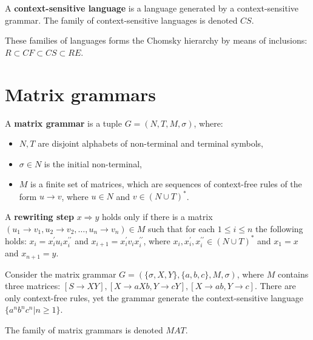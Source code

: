 \begin{definition}
A {\bf context-sensitive language} is a language generated by a context-sensitive grammar. The family of context-sensitive languages is denoted $CS$.
\end{definition}

These families of languages forms the Chomsky hierarchy by means of inclusions: $R \subset CF \subset CS \subset RE$.


\section{Matrix grammars} %
\label{sec:matrix_grammars}

\begin{definition}
A {\bf matrix grammar} is a tuple $G = (N,T,M,\sigma)$, where:
\begin{itemize}
  \item $N, T$ are disjoint alphabets of non-terminal and terminal symbols,
  \item $\sigma\in N$ is the initial non-terminal,
  \item $M$ is a finite set of matrices, which are sequences of context-free rules of the form $u\rightarrow v$, where $u\in N$ and $v\in (N\cup T)^*$.
\end{itemize}
\end{definition}

\begin{definition}
A {\bf rewriting step} $x\Rightarrow y$ holds only if there is a matrix $(u_1\rightarrow v_1, u_2\rightarrow v_2, \dots, u_n\rightarrow v_n) \in M$ such that for each $1\leq i\leq n$ the following holds: $x_i = x_i^{\prime}u_ix_i^{\prime\prime}$ and $x_{i+1} = x_i^{\prime}v_ix_i^{\prime\prime}$, where $x_i, x_i^{\prime}, x_i^{\prime\prime} \in (N\cup T)^*$ and $x_1 = x$ and $x_{n+1} = y$.
\end{definition}

\begin{example}
Consider the matrix grammar $G=(\{\sigma, X,Y\}, \{ a,b,c\}, M, \sigma)$, where $M$ contains three matrices: $[S\rightarrow XY], [X\rightarrow aXb, Y\rightarrow cY], [X\rightarrow ab, Y\rightarrow c]$. There are only context-free rules, yet the grammar generate the context-sensitive language $\{a^nb^nc^n|n\geq 1\}$.
\end{example}

The family of matrix grammars is denoted $MAT$.

